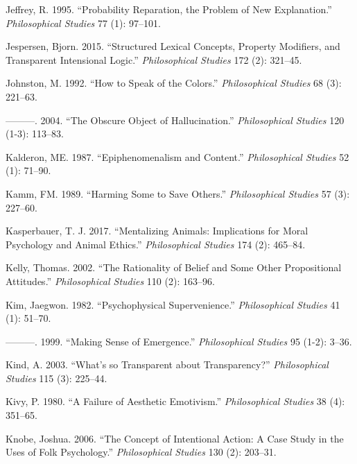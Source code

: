\documentclass[
  10pt,
  letterpaper,
  DIV=11,
  numbers=noendperiod,
  twoside]{scrartcl}
\newlength{\cslhangindent}
\newenvironment{CSLReferences}[2] %
 {\begin{list}{}{%
  \setlength{\itemindent}{0pt}
  \setlength{\leftmargin}{0pt}
  \setlength{\parsep}{0pt}
  \ifodd #1
   \setlength{\leftmargin}{\cslhangindent}
   \setlength{\itemindent}{-1\cslhangindent}
  \fi
  \setlength{\itemsep}{#2\baselineskip}}}
 {\end{list}}
\begin{document}
\begin{CSLReferences}{1}{0}
Jeffrey, R. 1995. {``Probability Reparation, the Problem of New
Explanation.''} \emph{Philosophical Studies} 77 (1): 97--101.

Jespersen, Bjorn. 2015. {``Structured Lexical Concepts, Property
Modifiers, and Transparent Intensional Logic.''} \emph{Philosophical
Studies} 172 (2): 321--45.

Johnston, M. 1992. {``How to Speak of the Colors.''} \emph{Philosophical
Studies} 68 (3): 221--63.

---------. 2004. {``The Obscure Object of Hallucination.''}
\emph{Philosophical Studies} 120 (1-3): 113--83.

Kalderon, ME. 1987. {``Epiphenomenalism and Content.''}
\emph{Philosophical Studies} 52 (1): 71--90.

Kamm, FM. 1989. {``Harming Some to Save Others.''} \emph{Philosophical
Studies} 57 (3): 227--60.

Kasperbauer, T. J. 2017. {``Mentalizing Animals: Implications for Moral
Psychology and Animal Ethics.''} \emph{Philosophical Studies} 174 (2):
465--84.

Kelly, Thomas. 2002. {``The Rationality of Belief and Some Other
Propositional Attitudes.''} \emph{Philosophical Studies} 110 (2):
163--96.

Kim, Jaegwon. 1982. {``Psychophysical Supervenience.''}
\emph{Philosophical Studies} 41 (1): 51--70.

---------. 1999. {``Making Sense of Emergence.''} \emph{Philosophical
Studies} 95 (1-2): 3--36.

Kind, A. 2003. {``What's so Transparent about Transparency?''}
\emph{Philosophical Studies} 115 (3): 225--44.

Kivy, P. 1980. {``A Failure of Aesthetic Emotivism.''}
\emph{Philosophical Studies} 38 (4): 351--65.

Knobe, Joshua. 2006. {``The Concept of Intentional Action: A Case Study
in the Uses of Folk Psychology.''} \emph{Philosophical Studies} 130 (2):
203--31.


\end{CSLReferences}
\end{document}
